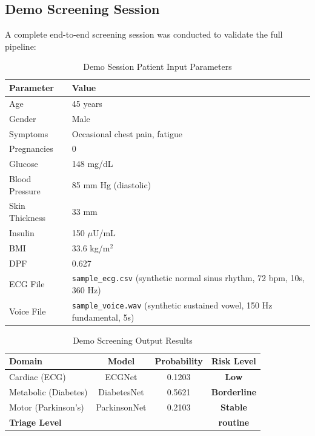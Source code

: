\subsection{Demo Screening Session}

A complete end-to-end screening session was conducted to validate the full pipeline:

\begin{table}[h!]
\centering
\caption{Demo Session Patient Input Parameters}
\renewcommand{\arraystretch}{1.3}
\begin{tabular}{|l|l|}
\hline
\textbf{Parameter} & \textbf{Value} \\
\hline
Age & 45 years \\
Gender & Male \\
Symptoms & Occasional chest pain, fatigue \\
Pregnancies & 0 \\
Glucose & 148 mg/dL \\
Blood Pressure & 85 mm Hg (diastolic) \\
Skin Thickness & 33 mm \\
Insulin & 150 $\mu$U/mL \\
BMI & 33.6 kg/m$^2$ \\
DPF & 0.627 \\
ECG File & \texttt{sample\_ecg.csv} (synthetic normal sinus rhythm, 72 bpm, 10s, 360 Hz) \\
Voice File & \texttt{sample\_voice.wav} (synthetic sustained vowel, 150 Hz fundamental, 5s) \\
\hline
\end{tabular}
\end{table}

\begin{table}[h!]
\centering
\caption{Demo Screening Output Results}
\renewcommand{\arraystretch}{1.3}
\begin{tabular}{|l|c|c|c|}
\hline
\textbf{Domain} & \textbf{Model} & \textbf{Probability} & \textbf{Risk Level} \\
\hline
Cardiac (ECG) & ECGNet & 0.1203 & \textbf{Low} \\
Metabolic (Diabetes) & DiabetesNet & 0.5621 & \textbf{Borderline} \\
Motor (Parkinson's) & ParkinsonNet & 0.2103 & \textbf{Stable} \\
\hline
\multicolumn{3}{|l|}{\textbf{Triage Level}} & \textbf{routine} \\
\hline
\end{tabular}
\end{table}

